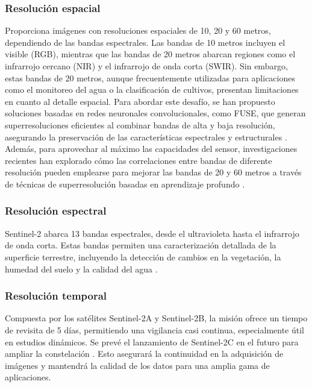         \subsubsection{Resolución espacial}
            Proporciona imágenes con resoluciones espaciales de 10, 20 y 60 metros, dependiendo de las bandas espectrales. Las bandas de 10 metros incluyen el visible (RGB), mientras que las bandas de 20 metros abarcan regiones como el infrarrojo cercano (NIR) y el infrarrojo de onda corta (SWIR). Sin embargo, estas bandas de 20 metros, aunque frecuentemente utilizadas para aplicaciones como el monitoreo del agua o la clasificación de cultivos, presentan limitaciones en cuanto al detalle espacial. Para abordar este desafío, se han propuesto soluciones basadas en redes neuronales convolucionales, como FUSE, que generan superresoluciones eficientes al combinar bandas de alta y baja resolución, asegurando la preservación de las características espectrales y estructurales \autocite{gargiulo2019fast}. Además, para aprovechar al máximo las capacidades del sensor, investigaciones recientes han explorado cómo las correlaciones entre bandas de diferente resolución pueden emplearse para mejorar las bandas de 20 y 60 metros a través de técnicas de superresolución basadas en aprendizaje profundo \autocite{lanaras2018super}.

        \subsubsection{Resolución espectral}
            Sentinel-2 abarca 13 bandas espectrales, desde el ultravioleta hasta el infrarrojo de onda corta. Estas bandas permiten una caracterización detallada de la superficie terrestre, incluyendo la detección de cambios en la vegetación, la humedad del suelo y la calidad del agua \autocite{wang2016fusion}.


        \subsubsection{Resolución temporal}

            Compuesta por los satélites Sentinel-2A y Sentinel-2B, la misión ofrece un tiempo de revisita de 5 días, permitiendo una vigilancia casi continua, especialmente útil en estudios dinámicos. Se prevé el lanzamiento de Sentinel-2C en el futuro para ampliar la constelación \autocite{Sentinel2C_Copernicus_2024}. Esto asegurará la continuidad en la adquisición de imágenes y mantendrá la calidad de los datos para una amplia gama de aplicaciones.
        
